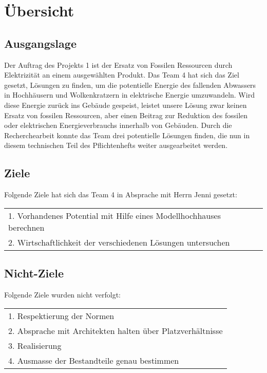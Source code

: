 \section{Übersicht} \label{sec:uebersicht}
\subsection{Ausgangslage}
Der Auftrag des Projekts 1 ist der Ersatz von Fossilen Ressourcen durch Elektrizität an einem ausgewählten Produkt. Das Team 4 hat sich das Ziel gesetzt, Lösungen zu finden, um die potentielle Energie des fallenden Abwassers in Hochhäusern und Wolkenkratzern in elektrische Energie umzuwandeln. Wird diese Energie zurück ins Gebäude gespeist, leistet unsere Lösung zwar keinen Ersatz von fossilen Ressourcen, aber einen Beitrag zur Reduktion des fossilen oder elektrischen Energieverbrauchs innerhalb von Gebäuden.
Durch die Recherchearbeit konnte das Team drei potentielle Lösungen finden, die nun in diesem technischen Teil des Pflichtenhefts weiter ausgearbeitet werden.

\subsection{Ziele}
Folgende Ziele hat sich das Team 4 in Absprache mit Herrn Jenni gesetzt:
\begin{table}[H]
\begin{tabular}{l}
1. Vorhandenes Potential mit Hilfe eines Modellhochhauses berechnen\\
2. Wirtschaftlichkeit der verschiedenen Lösungen untersuchen\\
\end{tabular}
\end{table}

\subsection{Nicht-Ziele}
Folgende Ziele wurden nicht verfolgt:
\begin{table}[H]
\begin{tabular}{l}
1. Respektierung der Normen\\
2. Absprache mit Architekten halten über Platzverhältnisse\\
3. Realisierung\\
4. Ausmasse der Bestandteile genau bestimmen\\
\end{tabular}
\end{table}
